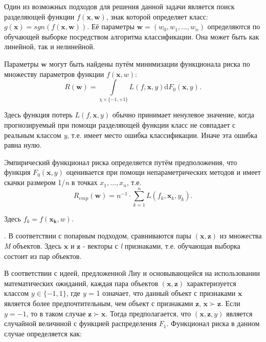 \documentclass[10pt,a5paper,oneside]{article}
\begin{document}
\par
Один из возможных подходов для решения данной задачи является поиск разделяющей функции \(f(\mathbf{x}, \mathbf{w})\), знак которой определяет класс: \(g(\mathbf{x})=sgn(f(\mathbf{x}, \mathbf{w}))\).
Её параметры \(\mathbf{w}=(w_0, w_1, \dots, w_n)\) определяются по обучающей выборке посредством алгоритма классификации. 
Она может быть как линейной, так и нелинейной.

\par
Параметры \(\mathbf{w}\) могут быть найдены путём минимизации функционала риска по множеству параметров функции \(f(\mathbf{x}, w)\):
\mbox{}
\[
R(\mathbf{w}) = \int \limits_{\chi \times \{-1, +1\}} L(f, \mathbf{x}, y) \mathrm{d} F_0(\mathbf{x}, y).
\]

Здесь функция потерь \(L(f, \mathbf{x}, y)\) обычно принимает ненулевое значение, когда прогнозируемый при помощи разделяющей функции класс не совпадает с реальным классом \emph{y}, т.е. имеет место ошибка классификации. 
Иначе эта ошибка равна нулю. 

\par
Эмпирический функционал риска определяется путём предположения, что функция \(F_0(\mathbf{x}, y)\) оценивается при помощи непараметрических методов  и имеет скачки размером 1/\emph{n} в точках \(x_1, \dots, x_n\), т.е.
\mbox{}
\[
R_{emp}(\mathbf{w}) = n^{-1} \cdot \sum \limits_{k=1}^n L(f_k, \mathbf{x}_k, y_k).
\]

Здесь \(f_k=f(\mathbf{x_k}, w)\). 


\vspace*{1em}

\par
{}. 
В соответствии с попарным подходом, сравниваются пары \((\mathbf{x},\mathbf{z})\) из множества \emph{M} объектов. 
Здесь \(\mathbf{x}\) и \(\mathbf{z}\) - векторы с \emph{l} признаками, т.е. обучающая выборка состоит из пар объектов.

\par
В соответствии с идеей, предложенной Лиу  и основывающейся на использовании математических ожиданий, каждая пара объектов \((\mathbf{x}, \mathbf{z})\) характеризуется классом \(y \in \{-1,1\}\), где \emph{y} = 1 означает, что данный объект с признаками \(\mathbf{x}\) является более предпочтительным, чем объект с признаками \(\mathbf{z}\), \(\mathbf{x} \succ \mathbf{z}\). 
Если \(y = -1\), то в таком случае \(\mathbf{z} \succ \mathbf{x}\). 
Тогда предполагается, что \((\mathbf{x}, \mathbf{z}, y)\) является случайной величиной с функцией распределения \(F_1\). 
Функционал риска в данном случае определяется как:
\end{document}
